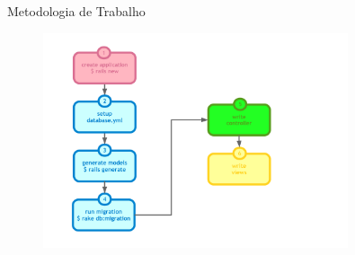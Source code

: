 \begin{frame}[fragile,t]{Metodologia de Trabalho}
	\begin{figure}[h!]
		\centering
		\includegraphics[width=0.80\textwidth]{imagens/metodologia-de-trabalho.pdf}
	\end{figure}
\end{frame}
